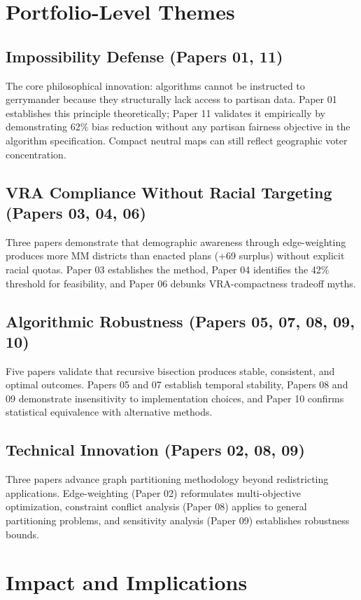 \documentclass[11pt]{article}
\begin{document}
\section*{Portfolio-Level Themes}

\subsection*{Impossibility Defense (Papers 01, 11)}
The core philosophical innovation: algorithms cannot be instructed to gerrymander because they structurally lack access to partisan data. Paper 01 establishes this principle theoretically; Paper 11 validates it empirically by demonstrating 62\% bias reduction without any partisan fairness objective in the algorithm specification. Compact neutral maps can still reflect geographic voter concentration.

\subsection*{VRA Compliance Without Racial Targeting (Papers 03, 04, 06)}
Three papers demonstrate that demographic awareness through edge-weighting produces more MM districts than enacted plans (+69 surplus) without explicit racial quotas. Paper 03 establishes the method, Paper 04 identifies the 42\% threshold for feasibility, and Paper 06 debunks VRA-compactness tradeoff myths.

\subsection*{Algorithmic Robustness (Papers 05, 07, 08, 09, 10)}
Five papers validate that recursive bisection produces stable, consistent, and optimal outcomes. Papers 05 and 07 establish temporal stability, Papers 08 and 09 demonstrate insensitivity to implementation choices, and Paper 10 confirms statistical equivalence with alternative methods.

\subsection*{Technical Innovation (Papers 02, 08, 09)}
Three papers advance graph partitioning methodology beyond redistricting applications. Edge-weighting (Paper 02) reformulates multi-objective optimization, constraint conflict analysis (Paper 08) applies to general partitioning problems, and sensitivity analysis (Paper 09) establishes robustness bounds.

\section*{Impact and Implications}
\end{document}
